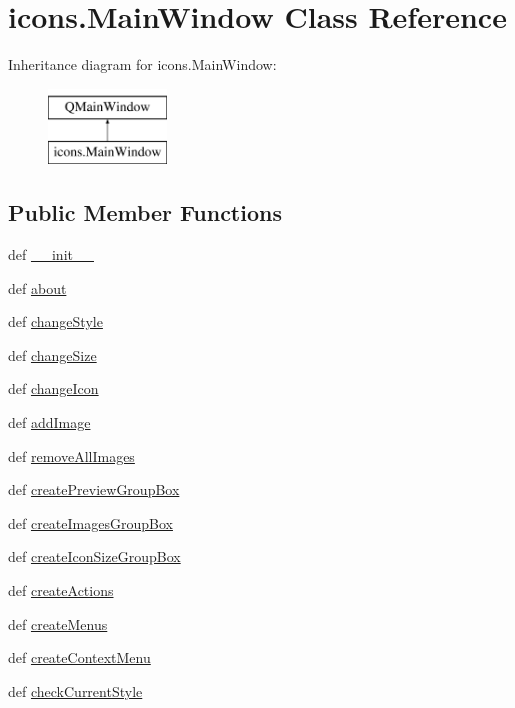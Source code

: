\hypertarget{classicons_1_1MainWindow}{}\section{icons.\+Main\+Window Class Reference}
\label{classicons_1_1MainWindow}
Inheritance diagram for icons.\+Main\+Window\+:\begin{figure}[H]
\begin{center}
\leavevmode
\includegraphics[height=2.000000cm]{classicons_1_1MainWindow}
\end{center}
\end{figure}
\subsection*{Public Member Functions}
\begin{DoxyCompactItemize}
\item 
def \hyperlink{classicons_1_1MainWindow_a7808c6c122b30b05557152aee508d1fc}{\+\_\+\+\_\+init\+\_\+\+\_\+}
\item 
def \hyperlink{classicons_1_1MainWindow_a6f38b080c918a39a8f38ba7239eea881}{about}
\item 
def \hyperlink{classicons_1_1MainWindow_a83b451ffef64cc1b546380457a07f376}{change\+Style}
\item 
def \hyperlink{classicons_1_1MainWindow_af432090f7e831e9edcfda8ce3bd14038}{change\+Size}
\item 
def \hyperlink{classicons_1_1MainWindow_a8a0097a1ec6173dc51c05ba42382c6af}{change\+Icon}
\item 
def \hyperlink{classicons_1_1MainWindow_aa713af052fcdb2718ac928eaaf2aaf92}{add\+Image}
\item 
def \hyperlink{classicons_1_1MainWindow_a54b6751a52770cb174c14717c7bd6765}{remove\+All\+Images}
\item 
def \hyperlink{classicons_1_1MainWindow_a8907559a57aaf72a88a9b3677af4ad86}{create\+Preview\+Group\+Box}
\item 
def \hyperlink{classicons_1_1MainWindow_ae88b581d9402a5a85795715149dd9dea}{create\+Images\+Group\+Box}
\item 
def \hyperlink{classicons_1_1MainWindow_a146ebf9dbffcc5d184b393bea28ccc09}{create\+Icon\+Size\+Group\+Box}
\item 
def \hyperlink{classicons_1_1MainWindow_a6eba59e3f5910f77fbdc39af7d999a05}{create\+Actions}
\item 
def \hyperlink{classicons_1_1MainWindow_a1444ecaff874abb0f0aeed23111af912}{create\+Menus}
\item 
def \hyperlink{classicons_1_1MainWindow_a30080d7a60585d96e2bf80d8359f9858}{create\+Context\+Menu}
\item 
def \hyperlink{classicons_1_1MainWindow_a3a3492f984c601b790e106d6768cd69e}{check\+Current\+Style}
\end{DoxyCompactItemize}
